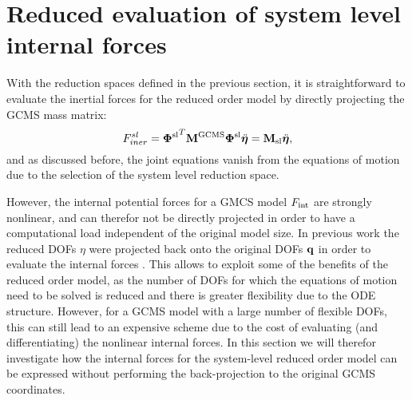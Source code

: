 
\section{{Reduced evaluation of system level internal forces}} \label{sec-hyper_reduction}

With the reduction spaces defined in the previous section, it is straightforward to evaluate the inertial forces for the reduced order model by directly projecting the GCMS mass matrix:
\begin{equation}
F_{iner}^{sl} = {\bm \Phi^{\rm sl}}^T\mathbf M^{\rm GCMS}\bm \Phi^{\rm sl}\ddot{\bm \eta} = \mathbf M_{\rm sl}\ddot{\bm \eta},
\end{equation}
and as discussed before, the joint equations vanish from the equations of motion due to the selection of the system level reduction space. 

However, the internal potential forces for a GMCS model $F_{\mathrm{int}}$ are strongly nonlinear, and can therefor not be directly projected in order to have a computational load independent of the original model size. In previous work the reduced DOFs $\eta$ were projected back onto the original DOFs $\mathbf q$ in order to evaluate the internal forces \cite{Humer}. This allows to exploit some of the benefits of the reduced order model, as the number of DOFs for which the equations of motion need to be solved is reduced and there is greater flexibility due to the ODE structure. However, for a GCMS model with a large number of flexible DOFs, this can still lead to an expensive scheme due to the cost of evaluating (and differentiating) the nonlinear internal forces. 
In this section we will therefor investigate how the internal forces for the system-level reduced order model can be expressed without performing the back-projection to the original GCMS coordinates.    


